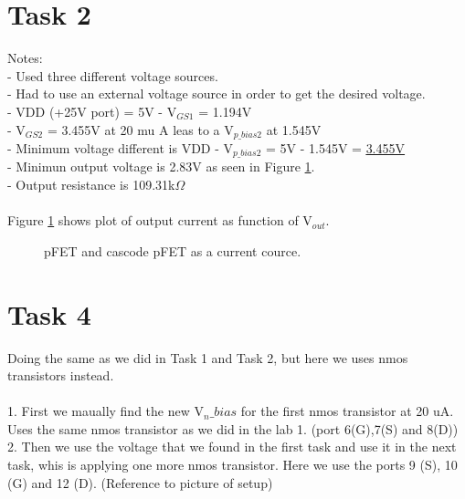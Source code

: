 \documentclass[a4paper,english,11pt]{article}
\begin{document}
\newpage
\section{Task 2}
Notes:\\
- Used three different voltage sources.\\
- Had to use an external voltage source in order to get the desired voltage.\\
- VDD (+25V port) = 5V
- V$_{GS1}$ = 1.194V\\
- V$_{GS2}$ = 3.455V at 20 mu A leas to a V$_{p\_bias2}$  at 1.545V\\
- Minimum voltage different is VDD - V$_{p\_bias2}$ = 5V - 1.545V = \underline{\underline{3.455V}}\\
- Minimun output voltage is 2.83V as seen in Figure \ref{fig:pfet-cascode-pfet}.\\
- Output resistance is 109.31k$\Omega$\\
\\
Figure \ref{fig:pfet-cascode-pfet} shows plot of output current as function of V$_{out}$.
\begin{figure}[htbp]
 \centering
  \caption{pFET and cascode pFET as a current cource.}
  \label{fig:pfet-cascode-pfet}	
\end{figure}

\newpage
\section{Task 4}
Doing the same as we did in Task 1 and Task 2, but here we uses nmos transistors instead.\\
\\
1. First we maually find the new V$_n\_bias$ for the first nmos transistor at 20 uA.\\
Uses the same nmos transistor as we did in the lab 1. (port 6(G),7(S) and 8(D))\\
2. Then we use the voltage that we found in the first task and use it in the next task, whis is applying one more nmos transistor. Here we
use the ports 9 (S), 10 (G) and 12 (D). (Reference to picture of setup)
\end{document}

